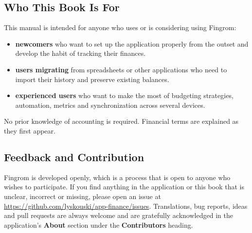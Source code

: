 \subsection*{Who This Book Is For}

This manual is intended for anyone who uses or is considering using Fingrom:

\begin{itemize}
  \item \textbf{newcomers} who want to set up the application properly from the outset and
  develop the habit of tracking their finances.
  \item \textbf{users migrating} from spreadsheets or other applications who need to import
  their history and preserve existing balances.
  \item \textbf{experienced users} who want to make the most of budgeting strategies,
  automation, metrics and synchronization across several devices.
\end{itemize}

\noindent No prior knowledge of accounting is required. Financial terms are explained as they
first appear.


\subsection*{Feedback and Contribution}

Fingrom is developed openly, which is a process that is open to anyone who wishes to
participate. If you find anything in the application or this book that is unclear, incorrect
or missing, please open an issue at
\href{https://github.com/lyskouski/app-finance/issues}{https://github.com/lyskouski/app-finance/issues}.
Translations, bug reports, ideas and pull requests are always welcome and are gratefully
acknowledged in the application's \textbf{About} section under the \textbf{Contributors}
heading.
